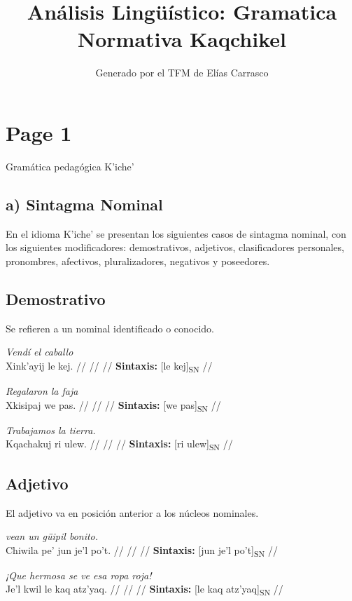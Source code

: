 \documentclass{article}%
\title{Análisis Lingüístico: Gramatica Normativa Kaqchikel}%
\author{Generado por el TFM de Elías Carrasco}%
\begin{document}
%
\normalsize%
\maketitle%
\section{Page 1}%
\label{sec:Page1}%
Gramática pedagógica K'iche' %
\subsection{a) Sintagma Nominal}%
\label{subsec:a)SintagmaNominal}%

%
En el idioma K'iche' se presentan los siguientes casos de sintagma nominal, con los %
siguientes modificadores: demostrativos, adjetivos, clasificadores personales, pronombres, %
afectivos, pluralizadores, negativos y poseedores. %
\subsection{Demostrativo}%
\label{subsec:Demostrativo}%

%
Se refieren a un nominal identificado o conocido. %
\par\medskip%
\ex
\textit{Vendí el caballo} \\
\begingl
\gla Xink'ayij le kej. //
\glb  //
\glc  //
\glft \textbf{Sintaxis:} [le kej]\textsubscript{SN} //
\endgl
\xe
%
\medskip%
\par\medskip%
\ex
\textit{Regalaron la faja} \\
\begingl
\gla Xkisipaj we pas. //
\glb  //
\glc  //
\glft \textbf{Sintaxis:} [we pas]\textsubscript{SN} //
\endgl
\xe
%
\medskip%
\par\medskip%
\ex
\textit{Trabajamos la tierra.} \\
\begingl
\gla Kqachakuj ri ulew. //
\glb  //
\glc  //
\glft \textbf{Sintaxis:} [ri ulew]\textsubscript{SN} //
\endgl
\xe
%
\medskip%
\subsection{Adjetivo}%
\label{subsec:Adjetivo}%

%
El adjetivo va en posición anterior a los núcleos nominales. %
\par\medskip%
\ex
\textit{vean un güipil bonito.} \\
\begingl
\gla Chiwila pe' jun je'l po't. //
\glb  //
\glc  //
\glft \textbf{Sintaxis:} [jun je'l po't]\textsubscript{SN} //
\endgl
\xe
%
\medskip%
\par\medskip%
\ex
\textit{¡Que hermosa se ve esa ropa roja!} \\
\begingl
\gla Je'l kwil le kaq atz'yaq. //
\glb  //
\glc  //
\glft \textbf{Sintaxis:} [le kaq atz'yaq]\textsubscript{SN} //
\endgl
\xe
%
\medskip%
\end{document}
